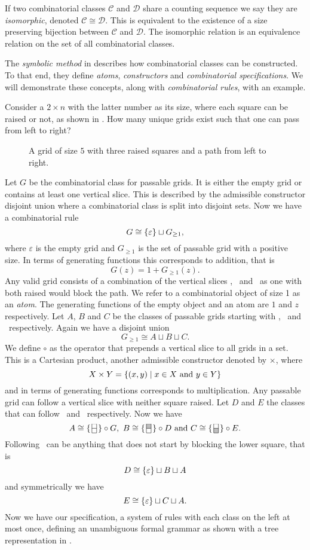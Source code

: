 If two combinatorial classes $\mathcal{C}$ and $\mathcal{D}$ share a counting sequence we say they are \emph{isomorphic}, denoted $\mathcal{C} \cong \mathcal{D}$. This is equivalent to the existence of a size preserving bijection between $\mathcal{C}$ and $\mathcal{D}$. The isomorphic relation is an equivalence relation on the set of all combinatorial classes.

The \emph{symbolic method} in  describes how combinatorial classes can be constructed. To that end, they define \emph{atoms}, \emph{constructors} and \emph{combinatorial specifications}. We will demonstrate these concepts, along with \emph{combinatorial rules}, with an example. 

Consider a $2 \times n$ with the latter number as its size, where each square can be raised or not, as shown in . How many unique grids exist such that one can pass from left to right?

\begin{figure}[htbp]
    \centering
    
    \caption{A grid of size $5$ with three raised squares and a path from left to right.}
    \label{fig:raised_grid}
\end{figure}

Let $G$ be the combinatorial class for passable grids. It is either the empty grid or contains at least one vertical slice. This is described by the admissible constructor disjoint union where a combinatorial class is split into disjoint sets. Now we have a combinatorial rule 
\[
    G \cong \left\{\varepsilon\right\} \sqcup G_{\geq 1},
\]
where $\varepsilon$ is the empty grid and $G_{\geq 1}$ is the set of passable grid with a positive size. In terms of generating functions this corresponds to addition, that is 
\[
    G(z) = 1 + G_{\geq1}(z).
\] 
Any valid grid consists of a combination of the vertical slices \gridN, \gridU\ and \gridD\ as one with both raised would block the path. We refer to a combinatorial object of size 1 as an \emph{atom}. The generating functions of the empty object and an atom are $1$ and $z$ respectively. Let $A$, $B$ and $C$ be the classes of passable grids starting with \gridN, \gridU\ and \gridD\ respectively. Again we have a disjoint union 
\[
    G_{\geq1} \cong A \sqcup B \sqcup C.
\]
We define $\circ$ as the operator that prepends a vertical slice to all grids in a set. This is a Cartesian product, another admissible constructor denoted by $\times$, where
\[
X \times Y = \left\{(x,y) \mid x\in X \text{ and } y \in Y\right\}
\]
and in terms of generating functions corresponds to multiplication. Any passable grid can follow a vertical slice with neither square raised. Let $D$ and $E$ the classes that can follow \gridU\ and \gridD\ respectively. Now we have 
\[
    A \cong \gridNSet \circ G, \ B \cong \gridUSet \circ D \text{ and } C \cong \gridDSet \circ E.
\]
Following \gridU\ can be anything that does not start by blocking the lower square, that is 
\[
    D \cong \left\{\varepsilon\right\} \sqcup B \sqcup A
\]
and symmetrically we have 
\[
    E \cong \left\{\varepsilon\right\} \sqcup C \sqcup A.
\]
Now we have our specification, a system of rules with each class on the left at most once, defining an unambiguous formal grammar as shown with a tree representation in .

